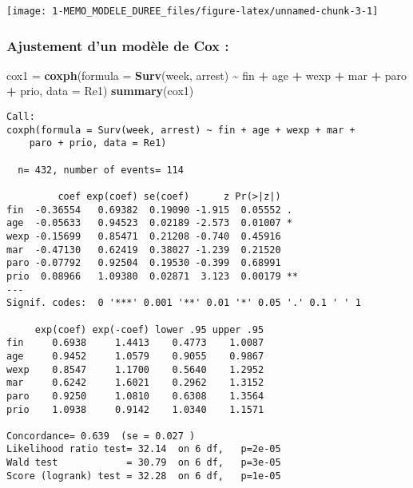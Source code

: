\documentclass[
]{article}
\newenvironment{Shaded}{\begin{snugshade}}{\end{snugshade}}
\newcommand{\AttributeTok}[1]{\textcolor[rgb]{0.13,0.29,0.53}{#1}}
\newcommand{\FunctionTok}[1]{\textcolor[rgb]{0.13,0.29,0.53}{\textbf{#1}}}
\newcommand{\NormalTok}[1]{#1}
\newcommand{\OtherTok}[1]{\textcolor[rgb]{0.56,0.35,0.01}{#1}}
\newcommand{\SpecialCharTok}[1]{\textcolor[rgb]{0.81,0.36,0.00}{\textbf{#1}}}
\begin{document}
\begin{center}\texttt{[image: 1-MEMO\_MODELE\_DUREE\_files/figure-latex/unnamed-chunk-3-1]} \end{center}

\hypertarget{ajustement-dun-moduxe8le-de-cox}{%
\subsubsection{Ajustement d'un modèle de Cox
:}\label{ajustement-dun-moduxe8le-de-cox}}

\begin{Shaded}
\begin{Highlighting}[]
\NormalTok{cox1 }\OtherTok{=} \FunctionTok{coxph}\NormalTok{(}\AttributeTok{formula =} \FunctionTok{Surv}\NormalTok{(week, arrest) }\SpecialCharTok{\textasciitilde{}}\NormalTok{ fin }\SpecialCharTok{+}\NormalTok{ age }\SpecialCharTok{+}\NormalTok{ wexp }\SpecialCharTok{+}\NormalTok{ mar }\SpecialCharTok{+} 
\NormalTok{               paro }\SpecialCharTok{+}\NormalTok{ prio, }\AttributeTok{data =}\NormalTok{ Re1)}
\FunctionTok{summary}\NormalTok{(cox1)}
\end{Highlighting}
\end{Shaded}

\begin{verbatim}
Call:
coxph(formula = Surv(week, arrest) ~ fin + age + wexp + mar + 
    paro + prio, data = Re1)

  n= 432, number of events= 114 

         coef exp(coef) se(coef)      z Pr(>|z|)   
fin  -0.36554   0.69382  0.19090 -1.915  0.05552 . 
age  -0.05633   0.94523  0.02189 -2.573  0.01007 * 
wexp -0.15699   0.85471  0.21208 -0.740  0.45916   
mar  -0.47130   0.62419  0.38027 -1.239  0.21520   
paro -0.07792   0.92504  0.19530 -0.399  0.68991   
prio  0.08966   1.09380  0.02871  3.123  0.00179 **
---
Signif. codes:  0 '***' 0.001 '**' 0.01 '*' 0.05 '.' 0.1 ' ' 1

     exp(coef) exp(-coef) lower .95 upper .95
fin     0.6938     1.4413    0.4773    1.0087
age     0.9452     1.0579    0.9055    0.9867
wexp    0.8547     1.1700    0.5640    1.2952
mar     0.6242     1.6021    0.2962    1.3152
paro    0.9250     1.0810    0.6308    1.3564
prio    1.0938     0.9142    1.0340    1.1571

Concordance= 0.639  (se = 0.027 )
Likelihood ratio test= 32.14  on 6 df,   p=2e-05
Wald test            = 30.79  on 6 df,   p=3e-05
Score (logrank) test = 32.28  on 6 df,   p=1e-05
\end{verbatim}
\end{document}
